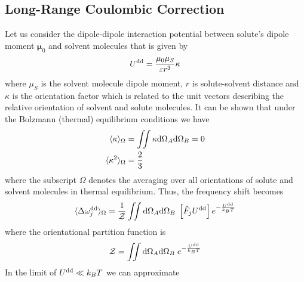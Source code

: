 \documentclass[b5paper,oneside,fleqn,11pt]{book}
\newcommand{\BM}[1]{\bm{#1}}
\begin{document}
\begin{refsection}

\subsection{Long\hyp{}Range Coulombic Correction}

Let us consider the dipole\hyp{}dipole interaction
potential between solute's dipole moment ${\BM \mu}_0$ 
and solvent molecules that is given by 
%
\begin{equation}
 U^{\rm dd} = \frac{\mu_0\mu_S}{\varepsilon r^3} \kappa
\end{equation}
%
where $\mu_S$ is the solvent molecule dipole moment, 
$r$ is solute\hyp{}solvent distance 
and $\kappa$ is the orientation factor which is related
to the unit vectors describing the relative orientation
of solvent and solute molecules. 
It can be shown that 
under the Bolzmann (thermal) equilibrium conditions we have
%
\begin{subequations}
\begin{align} \label{e:73626}
 \langle \kappa \rangle_{\Omega} &= \iint \kappa {\rm d}\Omega_A{\rm d}\Omega_B  = 0 \\
 \langle \kappa^2 \rangle_{\Omega} &= \frac{2}{3}
\end{align}
\end{subequations}
%
where the subscript
$\Omega$ denotes the averaging over all orientations of 
solute and solvent molecules in thermal equilibrium. \citep{London.TransFaradSoc.1937}
Thus, the frequency shift becomes
%
\begin{equation}
 \langle \Delta \omega_j^{\rm dd} \rangle_{\Omega} = 
\frac{1}{\mathcal{Z}} 
\iint {\rm d}\Omega_A{\rm d}\Omega_B \; \left[\hat{F}_j U^{\rm dd}\right] e^{-\frac{U^{\rm dd}}{k_BT}} 
\end{equation}
%
where the orientational 
partition function is
%
\begin{equation}
\mathcal{Z} =
\iint {\rm d}\Omega_A{\rm d}\Omega_B \; e^{-\frac{U^{\rm dd}}{k_BT}}
\end{equation}
%
In the limit of $U^{\rm dd}\ll k_BT$ we can approximate 

\end{refsection}
\end{document}
